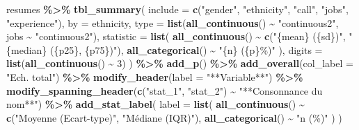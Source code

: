 \documentclass[
  11pt,
]{book}
\newenvironment{Shaded}{\begin{snugshade}}{\end{snugshade}}
\newcommand{\AttributeTok}[1]{\textcolor[rgb]{0.13,0.29,0.53}{#1}}
\newcommand{\DecValTok}[1]{\textcolor[rgb]{0.00,0.00,0.81}{#1}}
\newcommand{\FunctionTok}[1]{\textcolor[rgb]{0.13,0.29,0.53}{\textbf{#1}}}
\newcommand{\NormalTok}[1]{#1}
\newcommand{\SpecialCharTok}[1]{\textcolor[rgb]{0.81,0.36,0.00}{\textbf{#1}}}
\newcommand{\StringTok}[1]{\textcolor[rgb]{0.31,0.60,0.02}{#1}}
\numberwithin{equation}{section}
\numberwithin{countremarque}{section}
\begin{document}
\begin{Shaded}
\begin{Highlighting}[]
\NormalTok{resumes }\SpecialCharTok{\%\textgreater{}\%}
  \FunctionTok{tbl\_summary}\NormalTok{(}
    \AttributeTok{include =} \FunctionTok{c}\NormalTok{(}\StringTok{"gender"}\NormalTok{, }\StringTok{"ethnicity"}\NormalTok{, }\StringTok{"call"}\NormalTok{, }\StringTok{"jobs"}\NormalTok{, }\StringTok{"experience"}\NormalTok{),}
    \AttributeTok{by =}\NormalTok{ ethnicity,}
    \AttributeTok{type =} \FunctionTok{list}\NormalTok{(}\FunctionTok{all\_continuous}\NormalTok{() }\SpecialCharTok{\textasciitilde{}} \StringTok{"continuous2"}\NormalTok{,}
\NormalTok{                jobs }\SpecialCharTok{\textasciitilde{}} \StringTok{"continuous2"}\NormalTok{),}
    \AttributeTok{statistic =} \FunctionTok{list}\NormalTok{(}
      \FunctionTok{all\_continuous}\NormalTok{() }\SpecialCharTok{\textasciitilde{}} \FunctionTok{c}\NormalTok{(}\StringTok{"\{mean\} (\{sd\})"}\NormalTok{, }\StringTok{"\{median\} (\{p25\}, \{p75\})"}\NormalTok{),}
      \FunctionTok{all\_categorical}\NormalTok{() }\SpecialCharTok{\textasciitilde{}} \StringTok{"\{n\} (\{p\}\%)"}
\NormalTok{      ),}
    \AttributeTok{digits =} \FunctionTok{list}\NormalTok{(}\FunctionTok{all\_continuous}\NormalTok{() }\SpecialCharTok{\textasciitilde{}} \DecValTok{3}\NormalTok{)}
\NormalTok{    ) }\SpecialCharTok{\%\textgreater{}\%} 
  \FunctionTok{add\_p}\NormalTok{() }\SpecialCharTok{\%\textgreater{}\%} 
  \FunctionTok{add\_overall}\NormalTok{(}\AttributeTok{col\_label =} \StringTok{"Ech. total"}\NormalTok{) }\SpecialCharTok{\%\textgreater{}\%} 
  \FunctionTok{modify\_header}\NormalTok{(}\AttributeTok{label =} \StringTok{"**Variable**"}\NormalTok{) }\SpecialCharTok{\%\textgreater{}\%} 
  \FunctionTok{modify\_spanning\_header}\NormalTok{(}\FunctionTok{c}\NormalTok{(}\StringTok{"stat\_1"}\NormalTok{, }\StringTok{"stat\_2"}\NormalTok{) }\SpecialCharTok{\textasciitilde{}} \StringTok{"**Consonnance du nom**"}\NormalTok{) }\SpecialCharTok{\%\textgreater{}\%} 
  \FunctionTok{add\_stat\_label}\NormalTok{(}
    \AttributeTok{label =} \FunctionTok{list}\NormalTok{(}
      \FunctionTok{all\_continuous}\NormalTok{() }\SpecialCharTok{\textasciitilde{}} \FunctionTok{c}\NormalTok{(}\StringTok{"Moyenne (Ecart{-}type)"}\NormalTok{, }\StringTok{"Médiane (IQR)"}\NormalTok{),}
      \FunctionTok{all\_categorical}\NormalTok{() }\SpecialCharTok{\textasciitilde{}} \StringTok{"n (\%)"}
\NormalTok{    )}
\NormalTok{  )}
\end{Highlighting}
\end{Shaded}
\end{document}
